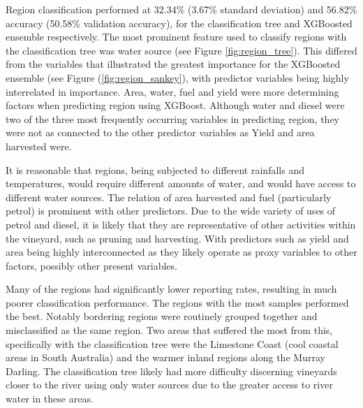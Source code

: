 \documentclass[review,12pt,authoryear]{elsarticle}
\begin{document}
\begin{linenumbers}
Region classification performed at 32.34\% (3.67\% standard deviation) and 56.82\% accuracy (50.58\% validation accuracy), for the classification tree and XGBoosted ensemble respectively. The most prominent feature used to classify regions with the classification tree was water source (see Figure \ref{fig:region_tree}). This differed from the variables that illustrated the greatest importance for the XGBoosted ensemble (see Figure (\ref{fig:region_sankey}), with predictor variables being highly interrelated in importance. Area, water, fuel and yield were more determining factors when predicting region using XGBoost. Although water and diesel were two of the three most frequently occurring variables in predicting region, they were not as connected to the other predictor variables as Yield and area harvested were.
\par
It is reasonable that regions, being subjected to different rainfalls and temperatures, would require different amounts of water, and would have access to different water sources. The relation of area harvested and fuel (particularly petrol) is prominent with other predictors. Due to the wide variety of uses of petrol and diesel, it is likely that they are representative of other activities within the vineyard, such as pruning and harvesting. With predictors such as yield and area being highly interconnected as they likely operate as proxy variables to other factors, possibly other present variables.
\par
Many of the regions had significantly lower reporting rates, resulting in much poorer classification performance. The regions with the most samples performed the best. Notably bordering regions were routinely grouped together and misclassified as the same region. Two areas that suffered the most from this, specifically with the classification tree were the Limestone Coast (cool coastal areas in South Australia) and the warmer inland regions along the Murray Darling. The classification tree likely had more difficulty discerning vineyards closer to the river using only water sources due to the greater access to river water in these areas.


\end{linenumbers}
\end{document}
